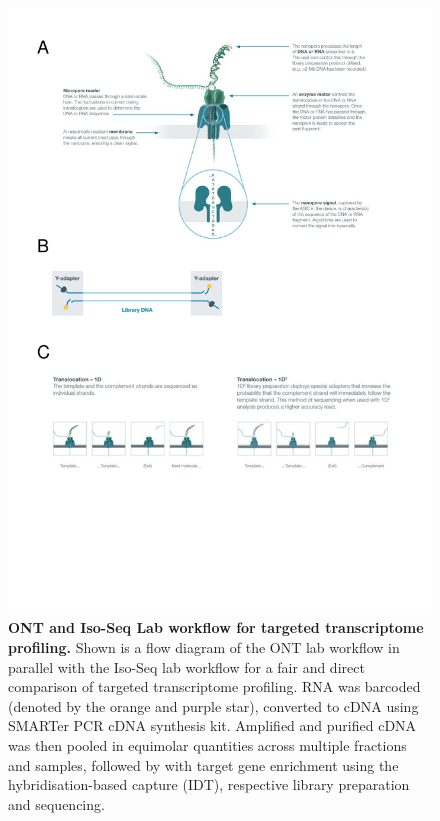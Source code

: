 \begin{figure}[]
	\centering
	\includegraphics[page=7,trim={0 6cm 0 0 },clip, scale = 0.7]{Figures/ProjectDevelopment_FiguresONT}
	\captionsetup{width=0.95\textwidth}
	\caption[ONT and Iso-Seq Lab workflow for targeted transcriptome profiling]%
	{\textbf{ONT and Iso-Seq Lab workflow for targeted transcriptome profiling.} Shown is a flow diagram of the ONT lab workflow in parallel with the Iso-Seq lab workflow for a fair and direct comparison of targeted transcriptome profiling. RNA was barcoded (denoted by the orange and purple star), converted to cDNA using SMARTer PCR cDNA synthesis kit. Amplified and purified cDNA was then pooled in equimolar quantities across multiple fractions and samples, followed by with target gene enrichment using the hybridisation-based capture (IDT), respective library preparation and sequencing.}
	\label{fig:ONT_TargetedProtocol}
\end{figure}


